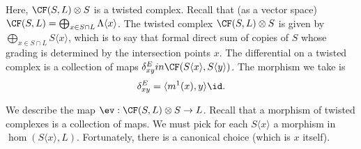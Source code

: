 
    Here, $\CF(S, L)\otimes S$ is a twisted complex. Recall that (as a vector space) $\CF(S, L)=\bigoplus_{x\in S\cap L} \Lambda\langle x \rangle$. 
    The twisted complex $\CF(S, L)\otimes S$ is given by $\bigoplus_{x\in S\cap L} S\langle x \rangle$, which is to say that formal direct sum of copies of $S$ whose grading is determined by the intersection points $x$.
    The differential on a twisted complex is a collection of maps $\delta_{xy}^E\\in \CF(S\langle x \rangle, S\langle y \rangle)$. The morphism we take is 
    \[\delta_{xy}^E= \langle m^1(x), y\rangle \id.\]
    
    We describe the map $\ev: \CF(S, L)\otimes S\to L$. Recall that a morphism of twisted complexes is a collection of maps. We must pick for each $S\langle x \rangle$ a morphism in $\hom(S\langle x \rangle , L)$. Fortunately, there is a canonical choice (which is $x$ itself). 

